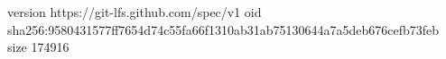 version https://git-lfs.github.com/spec/v1
oid sha256:9580431577ff7654d74c55fa66f1310ab31ab75130644a7a5deb676cefb73feb
size 174916
